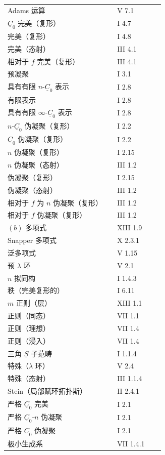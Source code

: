 \begin{longtable}{@{}p{0.65\linewidth}p{0.29\linewidth}@{}}
Adams 运算 & V 7.1\\[3pt]
$\underline C_0$ 完美（复形） & I 4.7\\
完美（复形） & I 4.8\\
完美（态射） & III 4.1\\
相对于 $f$ 完美（复形） & III 4.1\\
预凝聚 & I 3.1\\
具有有限 $n$-$\underline C_0$ 表示 & I 2.8\\
有限表示 & I 2.8\\
具有有限 $\infty$-$\underline C_0$ 表示 & I 2.8\\
$n$-$\underline C_0$ 伪凝聚（复形） & I 2.2\\
$\underline C_0$ 伪凝聚（复形） & I 2.2\\
$n$ 伪凝聚（复形） & I 2.15\\
$n$ 伪凝聚（态射） & III 1.2\\
伪凝聚（复形） & I 2.15\\
伪凝聚（态射） & III 1.2\\
相对于 $f$ 为 $n$ 伪凝聚（复形） & III 1.2\\
相对于 $f$ 伪凝聚（复形） & III 1.2\\
$(b)$ 多项式 & XIII 1.9\\
Snapper 多项式 & X 2.3.1\\
泛多项式 & V 1.15\\
预 $\lambda$ 环 & V 2.1\\[3pt]
$n$ 拟同构 & I 1.4.3\\[3pt]
秩（完美复形的） & I 6.11\\
$m$ 正则（层） & XIII 1.1\\
正则（同态） & VII 1.1\\
正则（理想） & VII 1.4\\
正则（浸入） & VII 1.4\\[3pt]
三角 $\underline S$ 子范畴 & I 1.1.4\\
特殊（$\lambda$ 环） & V 2.4\\
特殊（态射） & III 1.1.4\\
Stein（局部赋环拓扑斯） & II 2.4.1\\
严格 $\underline C_0$ 完美 & I 2.1\\
严格 $\underline C_0$-$n$ 伪凝聚 & I 2.1\\
严格 $\underline C_0$ 伪凝聚 & I 2.1\\
极小生成系 & VII 1.4.1
\end{longtable}

